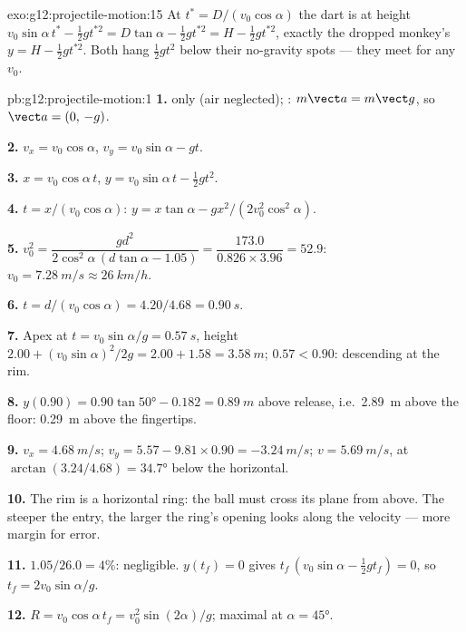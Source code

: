 \begin{solution}{exo:g12:projectile-motion:15}
At $t^* = D/(v_0\cos\alpha)$ the dart is at height
$v_0\sin\alpha\, t^* - \tfrac12 g t^{*2} = D\tan\alpha - \tfrac12 g
t^{*2} = H - \tfrac12 g t^{*2}$, exactly the dropped monkey's
$y = H - \tfrac12 g t^{*2}$. Both hang $\tfrac12 gt^2$ below their
no-gravity spots --- they meet for any $v_0$.
\end{solution}

\begin{solution}{pb:g12:projectile-motion:1}
\textbf{1.}  only (air neglected); :
$m\vect a = m\vect g$, so $\vect a = (0,\,-g)$.

\textbf{2.} $v_x = v_0\cos\alpha$, $v_y = v_0\sin\alpha - gt$.

\textbf{3.} $x = v_0\cos\alpha\, t$,
$y = v_0\sin\alpha\, t - \tfrac12 gt^2$.

\textbf{4.} $t = x/(v_0\cos\alpha)$:
$y = x\tan\alpha - g x^2/(2v_0^2\cos^2\alpha)$.

\textbf{5.} $v_0^2 = \dfrac{g d^2}{2\cos^2\alpha\,(d\tan\alpha -
1.05)} = \dfrac{173.0}{0.826 \times 3.96} = 52.9$:
$v_0 = \qty{7.28}{m/s} \approx \qty{26}{km/h}$.

\textbf{6.} $t = d/(v_0\cos\alpha) = 4.20/4.68 = \qty{0.90}{s}$.

\textbf{7.} Apex at $t = v_0\sin\alpha/g = \qty{0.57}{s}$, height
$2.00 + (v_0\sin\alpha)^2/2g = 2.00 + 1.58 = \qty{3.58}{m}$;
$0.57 < 0.90$: descending at the rim.

\textbf{8.} $y(0.90) = 0.90\tan\ang{50} - 0.182 = \qty{0.89}{m}$
above release, i.e.\ \qty{2.89}{m} above the floor: \qty{0.29}{m}
above the fingertips.

\textbf{9.} $v_x = \qty{4.68}{m/s}$;
$v_y = 5.57 - 9.81 \times 0.90 = \qty{-3.24}{m/s}$;
$v = \qty{5.69}{m/s}$, at $\arctan(3.24/4.68) = \ang{34.7}$ below
the horizontal.

\textbf{10.} The rim is a horizontal ring: the ball must cross its
plane from above. The steeper the entry, the larger the ring's
opening looks along the velocity --- more margin for error.

\textbf{11.} $1.05/26.0 = 4\%$: negligible. $y(t_f) = 0$ gives
$t_f\,(v_0\sin\alpha - \tfrac12 g t_f) = 0$, so
$t_f = 2v_0\sin\alpha/g$.

\textbf{12.} $R = v_0\cos\alpha\, t_f = v_0^2\sin(2\alpha)/g$;
maximal at $\alpha = \ang{45}$.


\end{solution}
